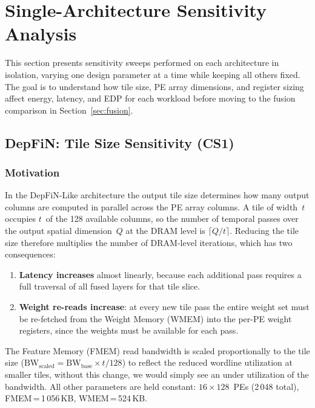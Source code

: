 \section{Single-Architecture Sensitivity Analysis}
\label{sec:single-arch}

This section presents sensitivity sweeps performed on each architecture
in isolation, varying one design parameter at a time while keeping all
others fixed.
The goal is to understand how tile size, PE array dimensions, and
register sizing affect energy, latency, and EDP for each workload
before moving to the fusion comparison in Section~\ref{sec:fusion}.

\subsection{DepFiN: Tile Size Sensitivity (CS1)}
\label{sec:cs1-tile}

\subsubsection{Motivation}

In the DepFiN-Like architecture the output tile size determines how
many output columns are computed in parallel across the PE array
columns.
A tile of width~$t$ occupies $t$~of the 128 available columns, so
the number of temporal passes over the output spatial
dimension~$Q$ at the DRAM level is $\lceil Q / t \rceil$.
Reducing the tile size therefore multiplies the number of DRAM-level
iterations, which has two consequences:
%
\begin{enumerate}
  \item \textbf{Latency increases} almost linearly, because
        each additional pass requires a full traversal of all
        fused layers for that tile slice.
  \item \textbf{Weight re-reads increase}: at every new tile pass the
        entire weight set must be re-fetched from the Weight Memory (WMEM)
        into the per-PE weight registers, since the weights must be available for each pass.
\end{enumerate}
%
The Feature Memory (FMEM) read bandwidth is scaled proportionally to the tile size
($\text{BW}_{\text{scaled}} = \text{BW}_{\text{base}} \times t / 128$) to reflect the reduced wordline utilization at smaller tiles,
without this change, we would simply see an under utilization of the bandwidth.
All other parameters are held constant: $16 \times 128$~PEs
(2\,048 total), FMEM\,=\,1\,056\,KB, WMEM\,=\,524\,KB.

